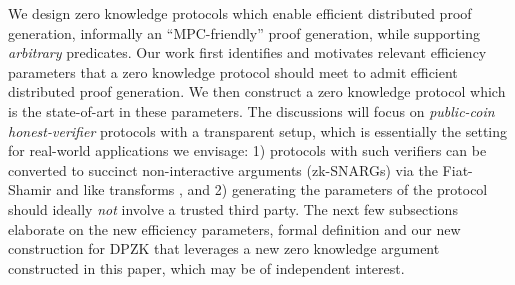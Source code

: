 We design zero knowledge protocols which enable efficient distributed proof generation, informally an ``MPC-friendly'' proof generation, while supporting \textit{arbitrary} predicates. %
Our work first identifies and motivates relevant efficiency parameters that a
zero knowledge protocol should meet to admit efficient distributed proof generation. 
We then construct a zero knowledge 
protocol which is the state-of-art in these parameters. The discussions will
focus on {\em public-coin honest-verifier} protocols with a transparent setup,
which is essentially the setting for real-world applications we envisage: 1) protocols with
such verifiers can be converted to succinct non-interactive  arguments
(zk-SNARGs)  via the Fiat-Shamir and like transforms \cite{FS86, BCS16}, and  2)
generating the parameters of the protocol should ideally {\em not} involve a
trusted third party. The next few subsections elaborate on the new efficiency
parameters, formal definition and our new construction for DPZK that leverages 
a new zero knowledge argument constructed in this paper, which may be of
independent interest. 

